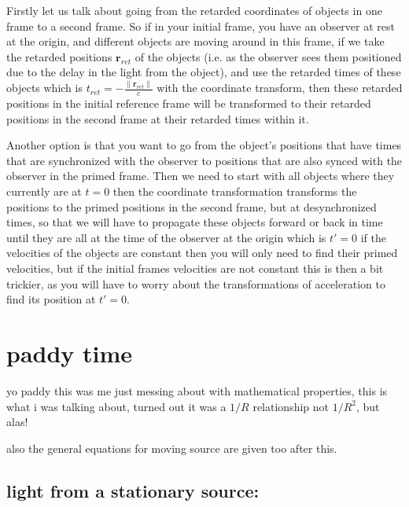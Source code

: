 Firstly let us talk about going from the retarded coordinates of objects in one frame to a second frame.
So if in your initial frame, you have an observer at rest at the origin, and different objects are moving around in this frame, if we take the retarded positions $\mathbf{r}_{ret}$ of the objects (i.e.
as the observer sees them positioned due to the delay in the light from the object), and use the retarded times of these objects which is ${t}_{ret} =-\frac{\|\mathbf{r}_{ret}\|}{c}$ with the coordinate transform, then these retarded positions in the initial reference frame will be transformed to their retarded positions in the second frame at their retarded times within it.
\newline

Another option is that you want to go from the object's positions that have times that are synchronized with the observer to positions that are also synced with the observer in the primed frame.
Then we need to start with all objects where they currently are at ${t} = 0$ then the coordinate transformation transforms the positions to the primed positions in the second frame, but at desynchronized times, so that we will have to propagate these objects forward or back in time until they are all at the time of the observer at the origin which is ${t{'}} = 0$ if the velocities of the objects are constant then you will only need to find their primed velocities, but if the initial frames velocities are not constant this is then a bit trickier, as you will have to worry about the transformations of acceleration to find its position at ${t{'}} = 0$.

\chapter{paddy time}

yo paddy this was me just messing about with mathematical properties, this is what i was talking about, turned out it was a $1/R$ relationship not $1/R^2$, but alas!

also the general equations for moving source are given too after this.

\section{light from a stationary source:}

